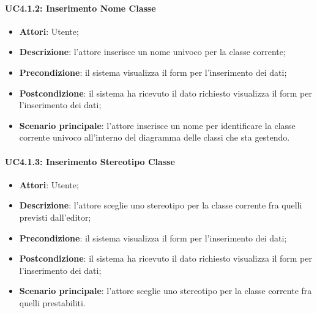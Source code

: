 \paragraph{UC4.1.2: Inserimento Nome Classe}
\label{UC4.1.2}
\begin{itemize}
	\item \textbf{Attori}: Utente;
	\item \textbf{Descrizione}: l'attore inserisce un nome univoco per la classe corrente;
	\item \textbf{Precondizione}: il sistema visualizza il form per l'inserimento dei dati;
	\item \textbf{Postcondizione}: il sistema ha ricevuto il dato richiesto visualizza il form per l'inserimento dei dati;
	\item \textbf{Scenario principale}: l'attore inserisce un nome per identificare la classe corrente univoco all'interno del diagramma delle classi che sta gestendo.
\end{itemize}

\paragraph{UC4.1.3: Inserimento Stereotipo Classe}
\label{UC4.1.3}
\begin{itemize}
	\item \textbf{Attori}: Utente;
	\item \textbf{Descrizione}: l'attore sceglie uno stereotipo per la classe corrente fra quelli previsti dall'editor;
	\item \textbf{Precondizione}: il sistema visualizza il form per l'inserimento dei dati;
	\item \textbf{Postcondizione}: il sistema ha ricevuto il dato richiesto visualizza il form per l'inserimento dei dati;
	\item \textbf{Scenario principale}: l'attore sceglie uno stereotipo per la classe corrente fra quelli prestabiliti.
\end{itemize}

